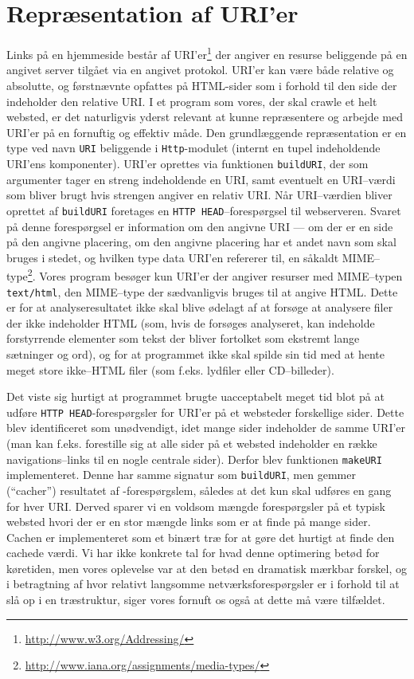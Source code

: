 \documentclass[a4paper,oneside]{memoir}
\begin{document}
\section{Repræsentation af URI'er}
\label{uriimpl}
Links på en hjemmeside består af
URI'er\footnote{\url{http://www.w3.org/Addressing/}} der angiver en
resurse beliggende på en angivet server tilgået via en angivet
protokol. URI'er kan være både relative og absolutte, og førstnævnte
opfattes på HTML-sider som i forhold til den side der indeholder den
relative URI. I et program som vores, der skal crawle et helt websted,
er det naturligvis yderst relevant at kunne repræsentere og arbejde
med URI'er på en fornuftig og effektiv måde. Den grundlæggende
repræsentation er en type ved navn \texttt{URI} beliggende i
\texttt{Http}-modulet (internt en tupel indeholdende URI'ens
komponenter). URI'er oprettes via funktionen \texttt{buildURI}, der som
argumenter tager en streng indeholdende en URI, samt eventuelt en
URI--værdi som bliver brugt hvis strengen angiver en relativ URI. Når
URI--værdien bliver oprettet af \texttt{buildURI} foretages en
\texttt{HTTP HEAD}--forespørgsel til webserveren. Svaret på denne
forespørgsel er information om den angivne URI --- om der er en side
på den angivne placering, om den angivne placering har et andet navn
som skal bruges i stedet, og hvilken type data URI'en refererer til,
en såkaldt
MIME--type\footnote{\url{http://www.iana.org/assignments/media-types/}}. Vores
program besøger kun URI'er der angiver resurser med MIME--typen
\texttt{text/html}, den MIME--type der sædvanligvis bruges til at
angive HTML. Dette er for at analyseresultatet ikke skal blive ødelagt
af at forsøge at analysere filer der ikke indeholder HTML (som, hvis
de forsøges analyseret, kan indeholde forstyrrende elementer som tekst
der bliver fortolket som ekstremt lange sætninger og ord), og for at
programmet ikke skal spilde sin tid med at hente meget store
ikke--HTML filer (som f.eks. lydfiler eller CD--billeder).

Det viste sig hurtigt at programmet brugte uacceptabelt meget tid blot
på at udføre \texttt{HTTP HEAD}-forespørgsler for URI'er på et
websteder forskellige sider. Dette blev identificeret som unødvendigt,
idet mange sider indeholder de samme URI'er (man kan f.eks. forestille
sig at alle sider på et websted indeholder en række navigations--links
til en nogle centrale sider). Derfor blev funktionen \texttt{makeURI}
implementeret. Denne har samme signatur som \texttt{buildURI}, men
gemmer (``cacher'') resultatet af -forespørgslem,
således at det kun skal udføres en gang for hver URI. Derved sparer vi
en voldsom mængde forespørgsler på et typisk websted hvori der er en
stor mængde links som er at finde på mange sider. Cachen er
implementeret som et binært træ for at gøre det hurtigt at finde den
cachede værdi. Vi har ikke konkrete tal for hvad denne optimering
betød for køretiden, men vores oplevelse var at den betød en dramatisk
mærkbar forskel, og i betragtning af hvor relativt langsomme
netværksforespørgsler er i forhold til at slå op i en træstruktur,
siger vores fornuft os også at dette må være tilfældet.
\end{document}
